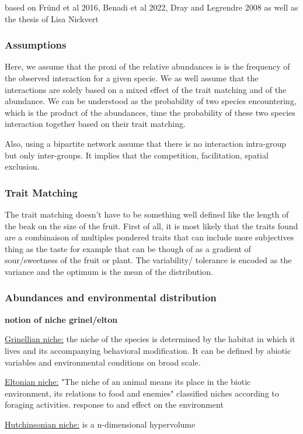 \documentclass{article}
\begin{document}
based on Fründ et al 2016, Benadi et al 2022, Dray and Legrendre 2008 as well as the thesis of Lisa Nickvert

\subsubsection{Assumptions}
Here, we assume that the proxi of the relative abundances is is the frequency of the observed interaction for a given specie. We as well assume that the interactions are solely based on a mixed effect of the trait matching and of the abundance. We can be understood as the probability of two species encountering, which is the product of the abundances, time the probability of these two species interaction together based on their trait matching.

Also, using a bipartite network assume that there is no interaction intra-group but only inter-groups. It implies that the competition, facilitation, spatial exclusion.

\subsubsection{Trait Matching}
The trait matching doesn't have to be something well defined like the length of the beak on the size of the fruit. First of all, it is most likely that the traits found are a combinaison of multiples pondered traits that can include more subjectives thing as the taste for example that can be though of as a gradient of sour/sweetness of the fruit or plant.
The variability/ tolerance is encoded as the variance and the optimum is the mean of the distribution.

\subsubsection{Abundances and environmental distribution}
\textbf{notion of niche grinel/elton}

\underline{Grinellian niche:} the niche of the species is determined by the habitat in which it lives and its accompanying behavioral modification. It can be defined by abiotic variables and environmental conditions on broad scale.

\underline{Eltonian niche:} "The niche of an animal means its place in the biotic environment, its relations to food and enemies"
classified niches according to foraging activities.
response to and effect on the environment

\underline{Hutchinsonian niche:} is a n-dimensional hypervolume
\end{document}
